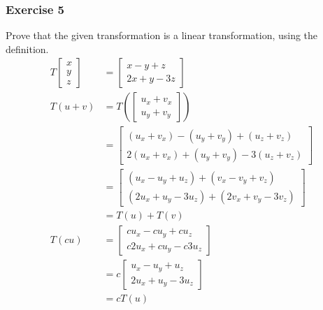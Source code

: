 \documentclass{math}
\begin{document}
\subsubsection*{Exercise 5}
Prove that the given transformation is a linear transformation, using the
definition.
\begin{align*}
  T\begin{bmatrix}x \\ y \\ z\end{bmatrix} &= \begin{bmatrix}
    x-y+z \\
    2x+y-3z
  \end{bmatrix} \\
  T(u+v) &= T\left(\begin{bmatrix}
    u_x+v_x \\
    u_y+v_y
  \end{bmatrix}\right) \\
  &= \begin{bmatrix}
    (u_x+v_x)-(u_y+v_y)+(u_z+v_z) \\
    2(u_x+v_x)+(u_y+v_y)-3(u_z+v_z)
  \end{bmatrix} \\
  &= \begin{bmatrix}
    (u_x-u_y+u_z)+(v_x-v_y+v_z) \\
    (2u_x+u_y-3u_z)+(2v_x+v_y-3v_z)
  \end{bmatrix} \\
  &= T(u)+T(v) \\
  T(cu) &= \begin{bmatrix}
    cu_x-cu_y+cu_z \\
    c2u_x+cu_y-c3u_z
  \end{bmatrix} \\
  &= c\begin{bmatrix}
    u_x-u_y+u_z \\
    2u_x+u_y-3u_z
  \end{bmatrix} \\
  &= cT(u)
\end{align*}
\end{document}

